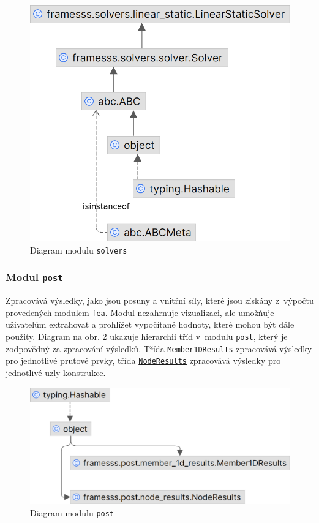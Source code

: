\begin{figure}[H]
    \includegraphics{assets/figures/framesss/uml/solvers.png}
    \caption{Diagram modulu \texttt{solvers}}
    \label{fig:modul_solvers}
\end{figure}

\subsubsection*{Modul \texttt{post}}
Zpracovává výsledky, jako jsou posuny a vnitřní síly, které jsou získány z~výpočtu provedených modulem \href{https://danberanek.github.io/framesss/gen/framesss.fea.html}{\texttt{fea}}. Modul nezahrnuje vizualizaci, ale umožňuje uživatelům extrahovat a prohlížet vypočítané hodnoty, které mohou být dále použity.
Diagram na obr. \ref{fig:modul_post} ukazuje hierarchii tříd v~modulu \href{https://danberanek.github.io/framesss/gen/framesss.post.html}{\texttt{post}}, který je zodpovědný za zpracování výsledků. Třída 
\href{https://danberanek.github.io/framesss/gen/framesss.post.member_1d_results.Member1DResults.html#framesss.post.member_1d_results.Member1DResults}{\texttt{Member1DResults}} zpracovává výsledky pro jednotlivé prutové prvky, třída
\href{https://danberanek.github.io/framesss/gen/framesss.post.node_results.NodeResults.html}{\texttt{NodeResults}} zpracovává výsledky pro jednotlivé uzly konstrukce.
\begin{figure}[H]
    \includegraphics{assets/figures/framesss/uml/post.png}
    \caption{Diagram modulu \texttt{post}}
    \label{fig:modul_post}
\end{figure}
